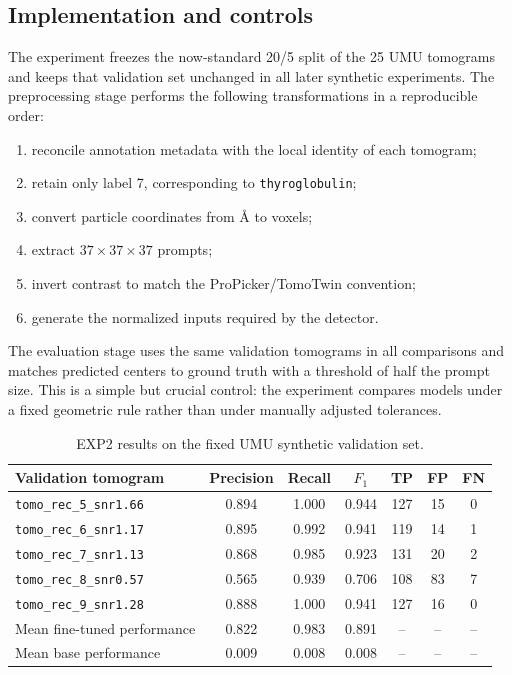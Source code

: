\documentclass[12pt,a4paper]{report}
\begin{document}
\subsection{Implementation and controls}
The experiment freezes the now-standard 20/5 split of the 25 UMU tomograms and keeps that validation set unchanged in all later synthetic experiments. The preprocessing stage performs the following transformations in a reproducible order:
\begin{enumerate}
  \item reconcile annotation metadata with the local identity of each tomogram;
  \item retain only label 7, corresponding to \texttt{thyroglobulin};
  \item convert particle coordinates from \AA{} to voxels;
  \item extract \(37 \times 37 \times 37\) prompts;
  \item invert contrast to match the ProPicker/TomoTwin convention;
  \item generate the normalized inputs required by the detector.
\end{enumerate}

The evaluation stage uses the same validation tomograms in all comparisons and matches predicted centers to ground truth with a threshold of half the prompt size. This is a simple but crucial control: the experiment compares models under a fixed geometric rule rather than under manually adjusted tolerances.

\begin{table}[H]
  \centering
  \small
  \begin{tabular}{lcccccc}
    \toprule
    Validation tomogram & Precision & Recall & \(F_1\) & TP & FP & FN \\
    \midrule
    \texttt{tomo\_rec\_5\_snr1.66} & 0.894 & 1.000 & 0.944 & 127 & 15 & 0 \\
    \texttt{tomo\_rec\_6\_snr1.17} & 0.895 & 0.992 & 0.941 & 119 & 14 & 1 \\
    \texttt{tomo\_rec\_7\_snr1.13} & 0.868 & 0.985 & 0.923 & 131 & 20 & 2 \\
    \texttt{tomo\_rec\_8\_snr0.57} & 0.565 & 0.939 & 0.706 & 108 & 83 & 7 \\
    \texttt{tomo\_rec\_9\_snr1.28} & 0.888 & 1.000 & 0.941 & 127 & 16 & 0 \\
    \midrule
    Mean fine-tuned performance & 0.822 & 0.983 & 0.891 & -- & -- & -- \\
    Mean base performance & 0.009 & 0.008 & 0.008 & -- & -- & -- \\
    \bottomrule
  \end{tabular}
  \caption{EXP2 results on the fixed UMU synthetic validation set.}
  \label{tab:exp2-results}
\end{table}
\end{document}

